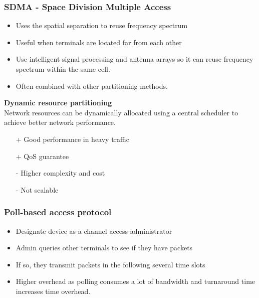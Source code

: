 \subsubsection{SDMA - Space Division Multiple Access}
\begin{itemize}
	\item Uses the spatial separation to reuse frequency spectrum
	\item Useful when terminals are located far from each other
	\item Use intelligent signal processing and antenna arrays so it can reuse frequency spectrum within the same cell.
	\item Often combined with other partitioning methods.
\end{itemize}

\textbf{Dynamic resource partitioning} \\
Network resources can be dynamically allocated using a central scheduler to achieve better network performance. 
\begin{itemize}
	\item[+] Good performance in heavy traffic
	\item[+] QoS guarantee
	\item[-] Higher complexity and cost
	\item[-] Not scalable
\end{itemize}
\subsubsection{Poll-based access protocol}
\begin{itemize}
	\item Designate device as a channel access administrator
	\item Admin queries other terminals to see if they have packets
	\item If so, they transmit packets in the following several time slots
	\item Higher overhead as polling consumes a lot of bandwidth and turnaround time increases time overhead.
\end{itemize}
